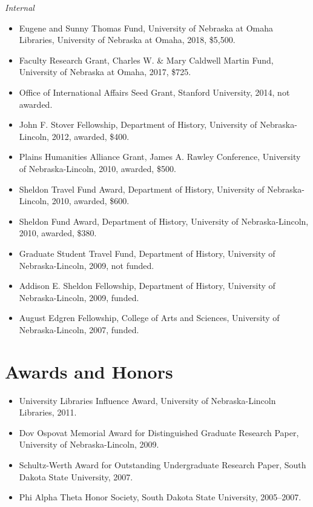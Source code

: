 \emph{Internal}

\begin{itemize}
\tightlist
\item
  Eugene and Sunny Thomas Fund, University of Nebraska at Omaha
  Libraries, University of Nebraska at Omaha, 2018, \$5,500.
\item
  Faculty Research Grant, Charles W. \& Mary Caldwell Martin Fund,
  University of Nebraska at Omaha, 2017, \$725.
\item
  Office of International Affairs Seed Grant, Stanford University, 2014,
  not awarded.
\item
  John F. Stover Fellowship, Department of History, University of
  Nebraska-Lincoln, 2012, awarded, \$400.
\item
  Plains Humanities Alliance Grant, James A. Rawley Conference,
  University of Nebraska-Lincoln, 2010, awarded, \$500.
\item
  Sheldon Travel Fund Award, Department of History, University of
  Nebraska-Lincoln, 2010, awarded, \$600.
\item
  Sheldon Fund Award, Department of History, University of
  Nebraska-Lincoln, 2010, awarded, \$380.
\item
  Graduate Student Travel Fund, Department of History, University of
  Nebraska-Lincoln, 2009, not funded.
\item
  Addison E. Sheldon Fellowship, Department of History, University of
  Nebraska-Lincoln, 2009, funded.
\item
  August Edgren Fellowship, College of Arts and Sciences, University of
  Nebraska-Lincoln, 2007, funded.
\end{itemize}

\section{Awards and Honors}\label{awards-and-honors}

\begin{itemize}
\tightlist
\item
  University Libraries Influence Award, University of Nebraska-Lincoln
  Libraries, 2011.
\item
  Dov Ospovat Memorial Award for Distinguished Graduate Research Paper,
  University of Nebraska-Lincoln, 2009.
\item
  Schultz-Werth Award for Outstanding Undergraduate Research Paper,
  South Dakota State University, 2007.
\item
  Phi Alpha Theta Honor Society, South Dakota State University,
  2005--2007.
\end{itemize}

